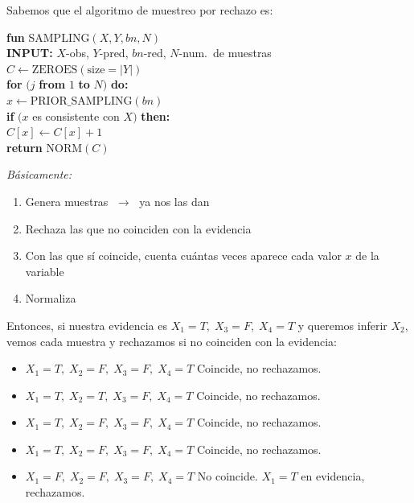 \noindent Sabemos que el algoritmo de muestreo por rechazo es:

\medskip
\begin{ttfamily}
  \noindent\textbf{fun} SAMPLING$(X, Y, bn, N)$\\
  \textbf{INPUT:} $X$-obs, $Y$-pred, $bn$-red, $N$-num.\ de muestras\\[1mm]
  \hspace*{4mm} $C \leftarrow \text{ZEROES}(\text{size} = |Y|)$\\
  \hspace*{4mm} \textbf{for} $(j$ \textbf{from} $1$ \textbf{to} $N)$ \textbf{do:}\\
  \hspace*{8mm} $x \leftarrow \text{PRIOR\_SAMPLING}(bn)$\\
  \hspace*{8mm} \textbf{if} $(x$ es consistente con $X)$ \textbf{then:}\\
  \hspace*{12mm} $C[x] \leftarrow C[x] + 1$\\
  \hspace*{4mm} \textbf{return} $\text{NORM}(C)$
\end{ttfamily}

\bigskip
\noindent\textit{Básicamente:}
\begin{enumerate}
  \item Genera muestras $\;\to\;$ ya nos las dan
  \item Rechaza las que no coinciden con la evidencia
  \item Con las que sí coincide, cuenta cuántas veces aparece cada valor $x$ de la variable
  \item Normaliza
\end{enumerate}

\noindent Entonces, si nuestra evidencia es $X_1 = T,\; X_3 = F,\; X_4 = T$ y queremos inferir $X_2$, vemos cada muestra y rechazamos si no coinciden con la evidencia:

\medskip
\begin{itemize}
  \item[a)] $X_1{=}T,\; X_2{=}F,\; X_3{=}F,\; X_4{=}T$ \quad Coincide, no rechazamos.
  \item[b)] $X_1{=}T,\; X_2{=}T,\; X_3{=}F,\; X_4{=}T$ \quad Coincide, no rechazamos.
  \item[c)] $X_1{=}T,\; X_2{=}F,\; X_3{=}F,\; X_4{=}T$ \quad Coincide, no rechazamos.
  \item[d)] $X_1{=}T,\; X_2{=}F,\; X_3{=}F,\; X_4{=}T$ \quad Coincide, no rechazamos.
  \item[e)] $X_1{=}F,\; X_2{=}F,\; X_3{=}F,\; X_4{=}T$ \quad No coincide. $X_1 = T$ en evidencia, rechazamos.
\end{itemize}

